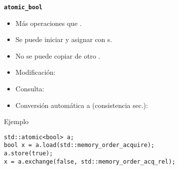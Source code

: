 \begin{frame}[t,fragile]{\texttt{\textbf{atomic\_bool}}}
\begin{itemize}
  \item Más operaciones que .
    \item Se puede iniciar y asignar con s.
    \item No se puede copiar de otro .
    \item Modificación: 
    \item Consulta: 
    \item Conversión automática a  (consistencia sec.): 
\end{itemize}
\begin{block}{Ejemplo}
\begin{lstlisting}
std::atomic<bool> a;
bool x = a.load(std::memory_order_acquire);
a.store(true);
x = a.exchange(false, std::memory_order_acq_rel);
\end{lstlisting}
\end{block}
\end{frame}

